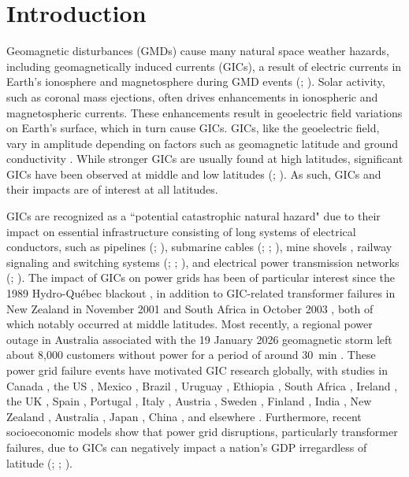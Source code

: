 \documentclass[draft]{agujournal2019}
\begin{document}
\section{Introduction}

Geomagnetic disturbances (GMDs) cause many natural space weather hazards, including geomagnetically induced currents (GICs), a result of electric currents in Earth’s ionosphere and magnetosphere during GMD events (; ). Solar activity, such as coronal mass ejections, often drives enhancements in ionospheric and magnetospheric currents. These enhancements result in geoelectric field variations on Earth's surface, which in turn cause GICs. GICs, like the geoelectric field, vary in amplitude depending on factors such as geomagnetic latitude and ground conductivity \cite{Wawrzaszek2024}. While stronger GICs are usually found at high latitudes, significant GICs have been observed at middle and low latitudes (; ). As such, GICs and their impacts are of interest at all latitudes.

GICs are recognized as a ``potential catastrophic natural hazard" \cite{Lugaz2020} due to their impact on essential infrastructure consisting of long systems of electrical conductors, such as pipelines (; ), submarine cables (; ; ), mine shovels \cite{Cordell2026}, railway signaling and switching systems (; ; ), and electrical power transmission networks (; ). 
The impact of GICs on power grids has been of particular interest since the 1989 Hydro-Québec blackout \cite{Bolduc2002}, in addition to GIC-related transformer failures in New Zealand in November 2001 \cite{Marshall2012} and South Africa in October 2003 \cite{Gaunt2007}, both of which notably occurred at middle latitudes. Most recently, a regional power outage in Australia associated with the 19 January 2026 geomagnetic storm left about 8,000 customers without power for a period of around 30~min \cite{Mandow2026}.
These power grid failure events have motivated GIC research globally, with studies in
Canada \cite{Cordell2024}, the US \cite{Wilkerson2026}, Mexico \cite{Caraballo2023}, Brazil \cite{Espinosa2023}, Uruguay \cite{Caraballo2013},  Ethiopia \cite{Liu2018}, South Africa \cite{Ngwira2011}, Ireland \cite{Blake2018}, the UK \cite{Hubert2024}, Spain \cite{Torta2023}, Portugal \cite{AlvesRibeiro2023}, Italy \cite{Pignatiello2026}, Austria \cite{Bailey2022}, Sweden \cite{Rosenqvist2025}, Finland \cite{Waghule2024}, India \cite{Vishnupriya2025}, New Zealand \cite{MacManus2025}, Australia \cite{Waters2025}, Japan \cite{Watari2025}, China \cite{Zhang2020}, and elsewhere \cite{Kelbert2019}. Furthermore, recent socioeconomic models show that power grid disruptions, particularly transformer failures, due to GICs can negatively impact a nation's GDP irregardless of latitude (; ; ). 
\end{document}
